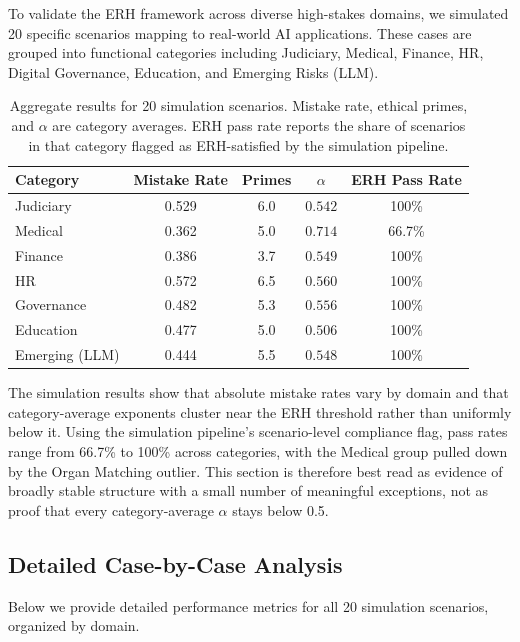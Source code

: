 \documentclass[12pt,a4paper]{article}
\theoremstyle{definition}
\theoremstyle{remark}
\begin{document}
To validate the ERH framework across diverse high-stakes domains, we simulated 20 specific scenarios mapping to real-world AI applications. These cases are grouped into functional categories including Judiciary, Medical, Finance, HR, Digital Governance, Education, and Emerging Risks (LLM).

\begin{table}[htbp]
\centering
\caption{Aggregate results for 20 simulation scenarios. Mistake rate, ethical primes, and $\alpha$ are category averages. ERH pass rate reports the share of scenarios in that category flagged as ERH-satisfied by the simulation pipeline.}
\label{tab:20_cases_summary}
\begin{tabular}{lcccc}
\toprule
\textbf{Category} & \textbf{Mistake Rate} & \textbf{Primes} & \textbf{$\alpha$} & \textbf{ERH Pass Rate} \\
\midrule
Judiciary      & 0.529 & 6.0 & $0.542$ & 100\% \\
Medical        & 0.362 & 5.0 & $0.714$ & 66.7\% \\
Finance        & 0.386 & 3.7 & $0.549$ & 100\% \\
HR             & 0.572 & 6.5 & $0.560$ & 100\% \\
Governance     & 0.482 & 5.3 & $0.556$ & 100\% \\
Education      & 0.477 & 5.0 & $0.506$ & 100\% \\
Emerging (LLM) & 0.444 & 5.5 & $0.548$ & 100\% \\
\bottomrule
\end{tabular}
\end{table}

The simulation results show that absolute mistake rates vary by domain and that category-average exponents cluster near the ERH threshold rather than uniformly below it. Using the simulation pipeline's scenario-level compliance flag, pass rates range from 66.7\% to 100\% across categories, with the Medical group pulled down by the Organ Matching outlier. This section is therefore best read as evidence of broadly stable structure with a small number of meaningful exceptions, not as proof that every category-average $\alpha$ stays below 0.5.

\subsection{Detailed Case-by-Case Analysis}

Below we provide detailed performance metrics for all 20 simulation scenarios, organized by domain.
\end{document}
